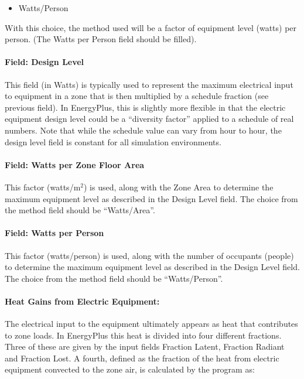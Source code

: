 \begin{itemize}
\tightlist
\item
  Watts/Person
\end{itemize}

With this choice, the method used will be a factor of equipment level (watts) per person. (The Watts per Person field should be filled).

\paragraph{Field: Design Level}\label{field-design-level-000}

This field (in Watts) is typically used to represent the maximum electrical input to equipment in a zone that is then multiplied by a schedule fraction (see previous field). In EnergyPlus, this is slightly more flexible in that the electric equipment design level could be a ``diversity factor'' applied to a schedule of real numbers. Note that while the schedule value can vary from hour to hour, the design level field is constant for all simulation environments.

\paragraph{Field: Watts per Zone Floor Area}\label{field-watts-per-zone-floor-area-1}

This factor (watts/m\(^{2}\)) is used, along with the Zone Area to determine the maximum equipment level as described in the Design Level field. The choice from the method field should be ``Watts/Area''.

\paragraph{Field: Watts per Person}\label{field-watts-per-person-1}

This factor (watts/person) is used, along with the number of occupants (people) to determine the maximum equipment level as described in the Design Level field. The choice from the method field should be ``Watts/Person''.

\paragraph{Heat Gains from Electric Equipment:}\label{heat-gains-from-electric-equipment}

The electrical input to the equipment ultimately appears as heat that contributes to zone loads. In EnergyPlus this heat is divided into four different fractions. Three of these are given by the input fields Fraction Latent, Fraction Radiant and Fraction Lost. A fourth, defined as the fraction of the heat from electric equipment convected to the zone air, is calculated by the program as:

